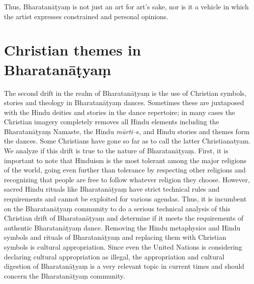 \vskip -2pt

Thus, Bharatanāṭyaṃ is not just an art for art’s sake, nor is it a vehicle in which the artist expresses constrained and personal opinions.


\section*{Christian themes in Bharatanāṭyaṃ}

The second drift in the realm of Bharatanāṭyaṃ is the use of Christian symbols, stories and theology in Bharatanāṭyaṃ dances. Sometimes these are juxtaposed with the Hindu deities and stories in the dance repertoire; in many cases the Christian imagery completely removes all Hindu elements including the Bharatanāṭyaṃ Namaste, the Hindu \textit{mūrti}–s, and Hindu stories and themes form the dances. Some Christians have gone so far as to call the latter Christianatyam. We analyze if this drift is true to the nature of Bharatanāṭyaṃ. First, it is important to note that Hinduism is the most tolerant among the major religions of the world, going even further than tolerance by respecting other religions and recognizing that people are free to follow whatever religion they choose. However, sacred Hindu rituals like Bharatanāṭyaṃ have strict technical rules and requirements and cannot be exploited for various agendas. Thus, it is incumbent on the Bharatanāṭyaṃ community to do a serious technical analysis of this Christian drift of Bharatanāṭyaṃ and determine if it meets the requirements of authentic Bharatanāṭyaṃ dance. Removing the Hindu metaphysics and Hindu symbols and rituals of Bharatanāṭyaṃ and replacing them with Christian symbols is cultural appropriation. Since even the United Nations is considering declaring cultural appropriation as illegal, the appropriation and cultural digestion of Bharatanāṭyaṃ is a very relevant topic in current times and should concern the Bharatanāṭyaṃ community.

